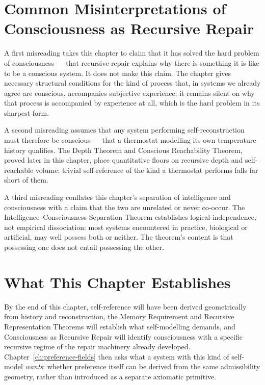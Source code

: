 \documentclass[12pt,twoside,openright]{book}
\begin{document}
\section{Common Misinterpretations of Consciousness as
  Recursive Repair}
\label{sec:ch21-misinterpretations}

A first misreading takes this chapter to claim that it has
solved the hard problem of consciousness --- that recursive
repair explains why there is something it is like to be a
conscious system. It does not make this claim. The chapter
gives necessary structural conditions for the kind of process
that, in systems we already agree are conscious, accompanies
subjective experience; it remains silent on why that process
is accompanied by experience at all, which is the hard
problem in its sharpest form.

A second misreading assumes that any system performing
self-reconstruction must therefore be conscious --- that a
thermostat modelling its own temperature history qualifies.
The Depth Theorem and Conscious Reachability Theorem, proved
later in this chapter, place quantitative floors on
recursive depth and self-reachable volume; trivial
self-reference of the kind a thermostat performs falls far
short of them.

A third misreading conflates this chapter's separation of
intelligence and consciousness with a claim that the two are
unrelated or never co-occur. The Intelligence--Consciousness
Separation Theorem establishes logical independence, not
empirical dissociation: most systems encountered in practice,
biological or artificial, may well possess both or neither.
The theorem's content is that possessing one does not entail
possessing the other.

\section{What This Chapter Establishes}
\label{sec:ch21-preview}

By the end of this chapter, self-reference will have been
derived geometrically from history and reconstruction, the
Memory Requirement and Recursive Representation Theorems will
establish what self-modelling demands, and Consciousness as
Recursive Repair will identify consciousness with a specific
recursive regime of the repair machinery already developed.
Chapter~\ref{ch:preference-fields} then asks what a system
with this kind of self-model \emph{wants}: whether preference
itself can be derived from the same admissibility geometry,
rather than introduced as a separate axiomatic primitive.
\end{document}
